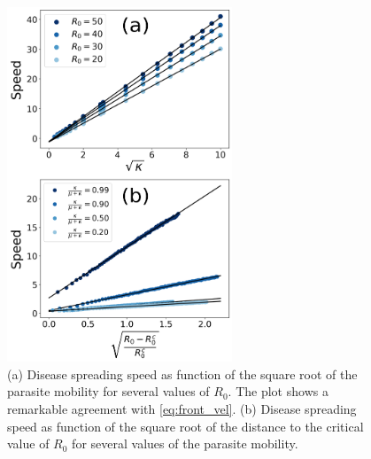 \begin{figure}[H]
    \centering
    \includegraphics[width=0.6\textwidth]{Figures/Front_velocity.png}
    \caption{(a) Disease spreading speed as function of the square root of
        the parasite mobility for several values of $R_0$. The plot shows a
        remarkable
        agreement with \cref{eq:front_vel}. (b) Disease spreading speed as
        function of
        the square root of the distance to the critical value of $R_0$ for
        several
        values of the parasite mobility.}
    \label{fig:front_velocity}
\end{figure}

